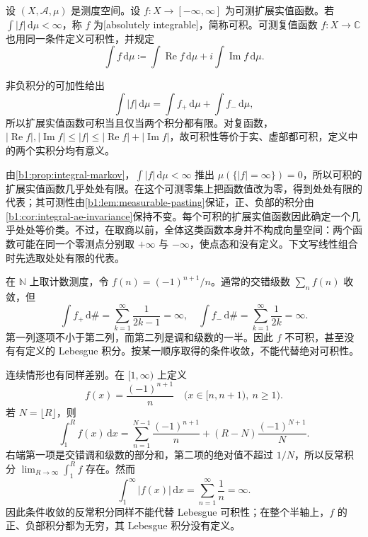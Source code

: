 \begin{definition}\label{b1:def:integrable-function}
设 \((X,\mathcal A,\mu)\) 是测度空间。设 \(f:X\rightarrow[-\infty,\infty]\) 为可测扩展实值函数。若 \(\int|f|\,\mathrm d\mu<\infty\)，称 \(f\) 为[absolutely integrable]，简称可积。可测复值函数 \(f:X\rightarrow\mathbb C\) 也用同一条件定义可积性，并规定
\[
\int f\,\mathrm d\mu
\coloneqq\int\operatorname{Re}f\,\mathrm d\mu
+i\int\operatorname{Im}f\,\mathrm d\mu.
\]
\end{definition}

非负积分的可加性给出
\[
\int|f|\,\mathrm d\mu
=\int f_+\,\mathrm d\mu+\int f_-\,\mathrm d\mu,
\]
所以扩展实值函数可积当且仅当两个积分都有限。对复函数，\(|\operatorname{Re}f|,|\operatorname{Im}f|\leq|f|\leq|\operatorname{Re}f|+|\operatorname{Im}f|\)，故可积性等价于实、虚部都可积，定义中的两个实积分均有意义。

\ProseParagraphBreak

由\cref{b1:prop:integral-markov}，\(\int|f|\,\mathrm d\mu<\infty\) 推出 \(\mu(\{|f|=\infty\})=0\)，所以可积的扩展实值函数几乎处处有限。在这个可测零集上把函数值改为零，得到处处有限的代表；其可测性由\cref{b1:lem:measurable-pasting}保证，正、负部的积分由\cref{b1:cor:integral-ae-invariance}保持不变。每个可积的扩展实值函数因此确定一个几乎处处等价类。不过，在取商以前，全体这类函数本身并不构成向量空间：两个函数可能在同一个零测点分别取 \(+\infty\) 与 \(-\infty\)，使点态和没有定义。下文写线性组合时先选取处处有限的代表。

\ProseParagraphBreak

在 \(\mathbb N\) 上取计数测度，令 \(f(n)=(-1)^{n+1}/n\)。通常的交错级数 \(\sum_n f(n)\) 收敛，但
\[
\int f_+\,\mathrm d\#=\sum_{k=1}^{\infty}\frac1{2k-1}=\infty,
\quad
\int f_-\,\mathrm d\#=\sum_{k=1}^{\infty}\frac1{2k}=\infty.
\]
第一列逐项不小于第二列，而第二列是调和级数的一半。因此 \(f\) 不可积，甚至没有有定义的 Lebesgue 积分。按某一顺序取得的条件收敛，不能代替绝对可积性。

\ProseParagraphBreak

连续情形也有同样差别。在 \([1,\infty)\) 上定义
\[
f(x)=\frac{(-1)^{n+1}}{n}\quad\bigl(x\in[n,n+1),\ n\geq1\bigr).
\]
若 \(N=\lfloor R\rfloor\)，则
\[
\int_1^R f(x)\,\mathrm dx
=\sum_{n=1}^{N-1}\frac{(-1)^{n+1}}n
+(R-N)\frac{(-1)^{N+1}}N.
\]
右端第一项是交错调和级数的部分和，第二项的绝对值不超过 \(1/N\)，所以反常积分 \(\lim_{R\to\infty}\int_1^R f\) 存在。然而
\[
\int_1^\infty|f(x)|\,\mathrm dx
=\sum_{n=1}^{\infty}\frac1n=\infty.
\]
因此条件收敛的反常积分同样不能代替 Lebesgue 可积性；在整个半轴上，\(f\) 的正、负部积分都为无穷，其 Lebesgue 积分没有定义。

